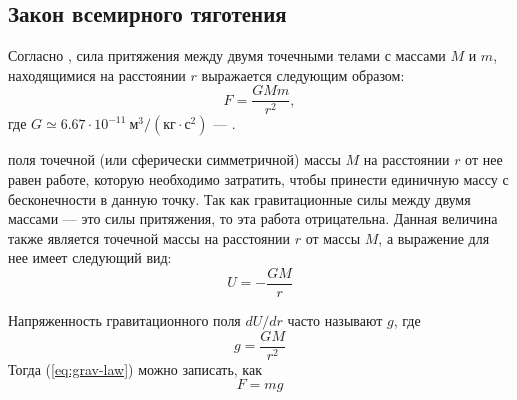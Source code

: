 \subsection{Закон всемирного тяготения}
Согласно , сила притяжения 
между двумя точечными телами с массами $M$ и $m$,
находящимися на расстоянии $r$ выражается следующим
образом:\begin{equation}
	F=\frac{GMm}{r^2}, \label{eq:grav-law}
\end{equation}
где $G\simeq 6.67\cdot 10^{-11}~\text{м}^3 / 
\left( \text{кг} \cdot \text{с}^2 \right)$ --- 
.

 поля точечной (или сферически 
симметричной) массы $M$ на расстоянии $r$ от нее равен
работе, которую необходимо затратить, чтобы принести
единичную массу с бесконечности в данную точку. Так как
гравитационные силы между двумя массами --- это силы 
притяжения, то эта работа отрицательна. Данная
величина также является  точечной
массы на расстоянии $r$ от массы $M$, а выражение для нее имеет 
следующий вид:\begin{equation}
U=-\frac{GM}{r}
\end{equation}

Напряженность гравитационного поля $dU/dr$ часто называют 
 $g$, где
\begin{equation}
	g = \frac{GM}{r^2}
	\label{eq:g}
\end{equation}
Тогда (\ref{eq:grav-law}) можно записать, как \begin{equation}
	F = mg
\end{equation}
